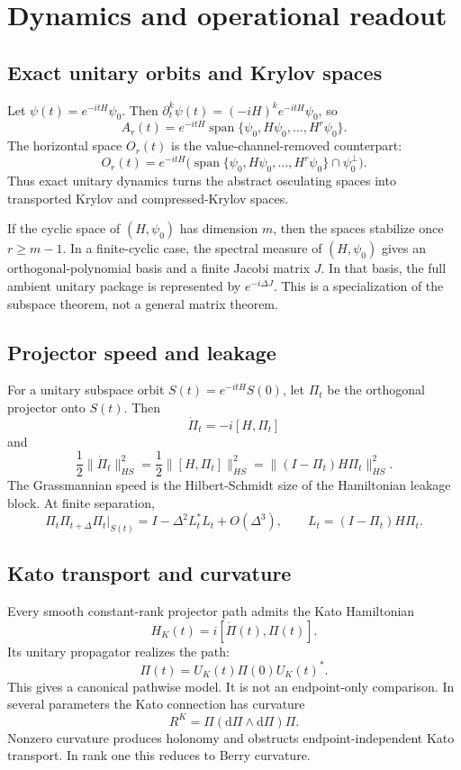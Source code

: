 \documentclass[11pt]{amsart}
\newcommand{\Span}{\operatorname{span}}
\newcommand{\Id}{I}
\newcommand{\Proj}{\Pi}
\newcommand{\dd}{\mathrm d}
\begin{document}
\section{Dynamics and operational readout}

\subsection{Exact unitary orbits and Krylov spaces}

Let \(\psi(t)=e^{-itH}\psi_0\). Then
\(\partial_t^k\psi(t)=(-iH)^ke^{-itH}\psi_0\), so
\[
        A_r(t)=e^{-itH}\Span\{\psi_0,H\psi_0,\ldots,H^r\psi_0\}.
\]
The horizontal space \(O_r(t)\) is the value-channel-removed counterpart:
\[
        O_r(t)=e^{-itH}\bigl(\Span\{\psi_0,H\psi_0,\ldots,H^r\psi_0\}
                 \cap \psi_0^\perp\bigr).
\]
Thus exact unitary dynamics turns the abstract osculating spaces into
transported Krylov and compressed-Krylov spaces.

If the cyclic space of \((H,\psi_0)\) has dimension \(m\), then the spaces
stabilize once \(r\ge m-1\). In a finite-cyclic case, the spectral measure of
\((H,\psi_0)\) gives an orthogonal-polynomial basis and a finite Jacobi matrix
\(J\). In that basis, the full ambient unitary package is represented by
\(e^{-i\Delta J}\). This is a specialization of the subspace theorem, not a
general matrix theorem.

\subsection{Projector speed and leakage}

For a unitary subspace orbit \(S(t)=e^{-itH}S(0)\), let \(\Proj_t\) be the
orthogonal projector onto \(S(t)\). Then
\[
        \dot\Proj_t=-i[H,\Proj_t]
\]
and
\[
        \frac12\|\dot\Proj_t\|_{HS}^2
        =
        \frac12\|[H,\Proj_t]\|_{HS}^2
        =
        \|(\Id-\Proj_t)H\Proj_t\|_{HS}^2 .
\]
The Grassmannian speed is the Hilbert-Schmidt size of the Hamiltonian leakage
block. At finite separation,
\[
        \Proj_t\Proj_{t+\Delta}\Proj_t|_{S(t)}
        =
        \Id-\Delta^2L_t^*L_t+O(\Delta^3),
        \qquad L_t=(\Id-\Proj_t)H\Proj_t.
\]

\subsection{Kato transport and curvature}

Every smooth constant-rank projector path admits the Kato Hamiltonian
\[
        H_K(t)=i[\dot\Proj(t),\Proj(t)].
\]
Its unitary propagator realizes the path:
\[
        \Proj(t)=U_K(t)\Proj(0)U_K(t)^*.
\]
This gives a canonical pathwise model. It is not an endpoint-only comparison.
In several parameters the Kato connection has curvature
\[
        R^K=\Proj(\dd\Proj\wedge\dd\Proj)\Proj.
\]
Nonzero curvature produces holonomy and obstructs endpoint-independent Kato
transport. In rank one this reduces to Berry curvature.
\end{document}
